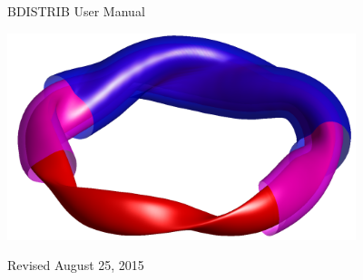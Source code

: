 \begin{center}

\vspace*{2in}

{\Huge BDISTRIB User Manual}

\vspace{1in}

\centerline{\includegraphics[width=4in]{bdistrib_w7x_offset_surfaces_1358x807.png}}


\vspace{2.0in}

Revised August 25, 2015

\end{center}

